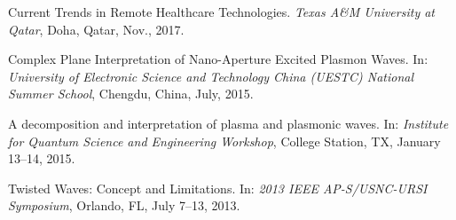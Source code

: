 \documentclass[10pt]{article}
\begin{document}
\begin{bibenum}

    \item Current Trends in Remote Healthcare Technologies.
        \emph{Texas A\&M University at Qatar}, Doha, Qatar, Nov., 2017.

    \item Complex Plane Interpretation of Nano-Aperture Excited Plasmon Waves.
        In: \emph{University of Electronic Science and Technology China (UESTC) National Summer School}, Chengdu, China, July, 2015.

    \item A decomposition and interpretation of plasma and plasmonic waves.
        In: \emph{Institute for Quantum Science and Engineering Workshop}, College Station, TX, January 13--14, 2015.

    \item Twisted Waves: Concept and Limitations.
        In: \emph{2013 IEEE AP-S/USNC-URSI Symposium}, Orlando, FL, July 7--13, 2013.

\end{bibenum}

\end{document}
